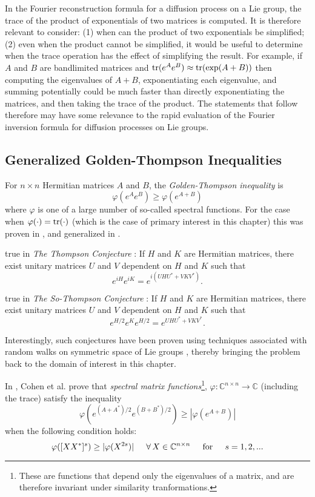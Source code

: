 \documentclass{svmult}
\newcommand{\beq}{ \begin{equation}}
\newcommand{\eeq}{ \end{equation} }
\newcommand{\IC}{\mathbb{C}}
\begin{document}
In the Fourier reconstruction formula for a diffusion process on a Lie group, the trace of the product of exponentials of two matrices is
computed. It is therefore relevant to consider: (1) when
can the product of two exponentials be simplified; (2) even
when the product cannot be simplified, it would be useful to
 determine when the trace
operation has the effect of simplifying the result.
For example, if $A$ and $B$ are bandlimited matrices
and ${\rm tr}(e^A e^B) \approx {\rm tr}(\exp(A+B))$ then
computing the eigenvalues of $A+B$, exponentiating each eigenvalue,
and summing potentially could be much faster than directly exponentiating the matrices, and then taking the trace of the product.
The statements that follow therefore may have some relevance to the
rapid evaluation of the Fourier inversion formula for diffusion
processes on Lie groups.

\subsection{Generalized Golden-Thompson Inequalities}


For $n\times n$ Hermitian matrices $A$ and $B$, the
{\it Golden-Thompson inequality} \cite{golden,thom1,thombook} is
\beq
\varphi(e^A e^B) \geq \varphi(e^{A+B})
\label{}
\eeq
where $\varphi$ is one of a large number of so-called spectral functions. For the case when $\varphi(\cdot) = {\rm tr}(\cdot)$
(which is the case of primary interest in this chapter) this
 was proven in \cite{golden}, and generalized in \cite{Lenard}.

 true in
\noindent
{\it The Thompson Conjecture} \cite{thom2}: If $H$ and $K$ are Hermitian matrices, there exist unitary matrices $U$ and $V$ dependent
on $H$ and $K$ such that
\beq
e^{iH} e^{iK} = e^{i(UHU^* + VKV^*)} .
\label{thmcon02}
\eeq

 true in
\noindent
{\it The So-Thompson Conjecture} \cite{sothomp91}: If $H$ and $K$ are Hermitian matrices, there exist unitary matrices $U$ and $V$ dependent
on $H$ and $K$ such that
\beq
e^{H/2} e^{K} e^{H/2} = e^{UHU^* + VKV^*} .
\label{sothmcon02}
\eeq

Interestingly, such conjectures have been proven \cite{soproof}
using techniques associated with random walks on symmetric space
of Lie groups \cite{Klyachko}, thereby bringing the problem back
to the domain of interest in this chapter.

In \cite{cohen82}, Cohen et al. prove that {\it spectral
matrix functions}\footnote{These are functions that depend only the eigenvalues of a matrix, and are therefore invariant under similarity tranformations.}, $\varphi:\IC^{n\times n} \rightarrow \IC$
(including the trace) satisfy the inequality
\beq
\varphi(e^{(A+A^*)/2}  e^{(B+B^*)/2}) \geq |\varphi(e^{A+B})|
\label{sothmcon02}
\eeq
when the following condition holds:
$$ \varphi([X X^*]^s) \geq |\varphi(X^{2s})| \hskip 0.2 true in
\forall\, X \in \IC^{n\times n}
\hskip 0.2 true in {\rm for} \hskip 0.2 true in s = 1,2, ... $$
\end{document}
